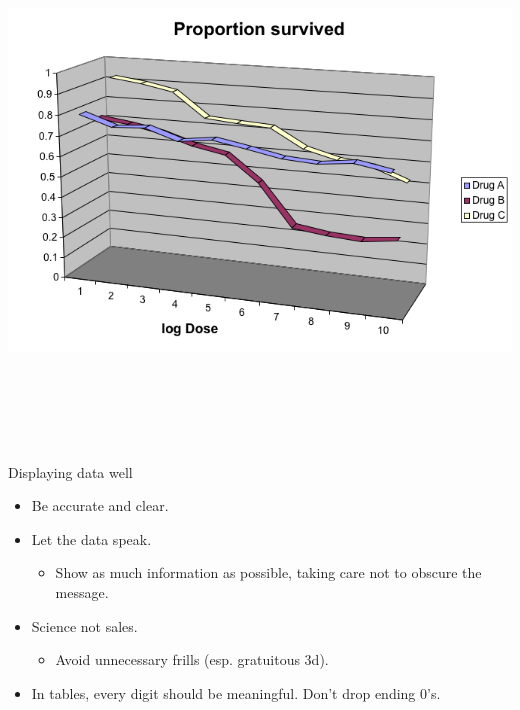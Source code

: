 \documentclass[12pt]{article}
\newcommand{\headsize}{\fontsize{35}{35} \selectfont}
\newcommand{\smallsize}{\fontsize{25}{30} \selectfont}
\newcommand{\smallersize}{\fontsize{20}{25} \selectfont}
\begin{document}
\centerline{\includegraphics[height=5.5in]{Figs/fig8b.png}}


\newpage


\headsize \color{yellow}
\hfill \begin{minipage}{5.75in}
\centering
Displaying data well
\end{minipage}

\vspace{30mm}
\smallsize \color{white}

\hspace{0.5in} \begin{minipage}[t]{9in}
\begin{itemize}

\itemsep24pt

\item Be accurate and clear.

\item Let the data speak.

{\color{blue} \smallersize
\begin{itemize}
\item Show as much information as possible, taking care not to
  obscure the message.
\end{itemize} }

\item Science not sales.

{\color{blue} \smallersize
\begin{itemize}
\item Avoid unnecessary frills (esp. gratuitous 3d).
\end{itemize} }

\item In tables, every digit should be meaningful. Don't drop ending 0's.

\end{itemize}
\end{minipage}
\end{document}
